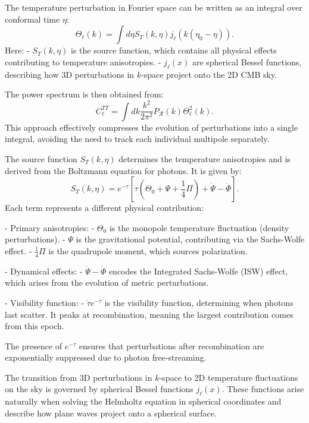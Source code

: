 \documentclass{aa}
\begin{document}
The temperature perturbation in Fourier space can be written as an integral over conformal time $\eta$:
\begin{equation}
\Theta_{\ell}(k) = \int d\eta S_T(k, \eta) j_\ell(k (\eta_0 - \eta)).
\end{equation}
Here:
- $S_T(k, \eta)$ is the source function, which contains all physical effects contributing to temperature anisotropies.  
- $j_\ell(x)$ are spherical Bessel functions, describing how 3D perturbations in $k$-space project onto the 2D CMB sky.  

The power spectrum is then obtained from:
\begin{equation}
C_\ell^{TT} = \int dk \frac{k^2}{2\pi^2} P_{\mathcal{R}}(k) \Theta_{\ell}^2(k).
\end{equation}
This approach effectively compresses the evolution of perturbations into a single integral, avoiding the need to track each individual multipole separately.

The source function $S_T(k, \eta)$ determines the temperature anisotropies and is derived from the Boltzmann equation for photons. It is given by:
\begin{equation}
S_T(k, \eta) = e^{-\tau} \left[ \dot{\tau} \left( \Theta_0 + \Psi + \frac{1}{4} \Pi \right) + \dot{\Psi} - \dot{\Phi} \right].
\end{equation}
Each term represents a different physical contribution:

- Primary anisotropies:  
  - $\Theta_0$ is the monopole temperature fluctuation (density perturbations).  
  - $\Psi$ is the gravitational potential, contributing via the Sachs-Wolfe effect.  
  - $\frac{1}{4} \Pi$ is the quadrupole moment, which sources polarization.  

- Dynamical effects:  
  - $\dot{\Psi} - \dot{\Phi}$ encodes the Integrated Sachs-Wolfe (ISW) effect, which arises from the evolution of metric perturbations.  

- Visibility function:  
  - $\dot{\tau} e^{-\tau}$ is the visibility function, determining when photons last scatter. It peaks at recombination, meaning the largest contribution comes from this epoch.

The presence of $e^{-\tau}$ ensures that perturbations after recombination are exponentially suppressed due to photon free-streaming.

The transition from 3D perturbations in $k$-space to 2D temperature fluctuations on the sky is governed by spherical Bessel functions $j_\ell(x)$. These functions arise naturally when solving the Helmholtz equation in spherical coordinates and describe how plane waves project onto a spherical surface.  
\end{document}
